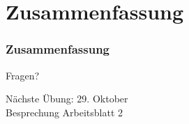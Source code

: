 \documentclass[c,18pt]{beamer}
\begin{document}
\setcounter{exercise}{1}

\setcounter{exercise}{2}

\setcounter{exercise}{3}

\def\kap{2}%

\section{Zusammenfassung}
\begin{frame}
  \frametitle{Zusammenfassung}%
\tableofcontents[hideallsubsections]
\end{frame}

\begin{frame}
\centering
\Huge\textcolor{KITgreen}{Fragen?}
\vspace{2cm}

{\LARGE
Nächste Übung: 29. Oktober\\
Besprechung Arbeitsblatt 2
}
\end{frame}


\end{document}

